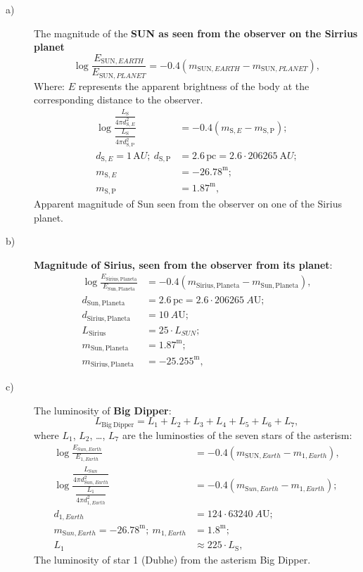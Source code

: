 \begin{description}
\item[a)] The magnitude of the \textbf{SUN as seen from the observer on the
  Sirrius planet} %
  \[ \log\frac{E_{\mathrm{SUN},EARTH}}{E_{\mathrm{SUN},PLANET}}
     = -0.4\left(m_{\mathrm{SUN},EARTH} - m_{\mathrm{SUN},PLANET}\right), \]
  Where: $E$ represents the apparent brightness of the body at the
  corresponding distance to the observer.
  \begin{align*}
  \log\frac{\dfrac{L_{\mathrm{S}}}{4\pi d_{\mathrm{S},E}^2}}
           {\dfrac{L_{\mathrm{S}}}{4\pi d_{\mathrm{S,P}}^2}}
    &= -0.4\left(m_{\mathrm{S},E} - m_{\mathrm{S,P}}\right);\\
  d_{\mathrm{S},E} = 1\,\mathrm{A}U;\
  d_{\mathrm{S,P}} &= 2.6\,\mathrm{pc}
    = 2.6\cdot206265\ \mathrm{A}U;\\
  m_{\mathrm{S},E} &= -26.78^{\mathrm{m}};\\
  m_{\mathrm{S,P}} &= 1.87^{\mathrm{m}},
  \end{align*}
  Apparent magnitude of Sun seen from the observer on one of the Sirius
  planet.
\item[b)] \textbf{Magnitude of Sirius, seen from the observer from its
  planet}:
  \begin{align*}
  \log\frac{E_{\mathrm{Sirius,Planeta}}}{E_{\mathrm{Sun,Planeta}}}
    &= -0.4\left(m_{\mathrm{Sirius,Planeta}}
       - m_{\mathrm{Sun,Planeta}}\right),\\
  d_{\mathrm{Sun,Planeta}} &= 2.6\,\mathrm{pc}
    = 2.6\cdot206265\ A\mathrm{U};\\
  d_{\mathrm{Sirius,Planeta}} &= 10\ A\mathrm{U};\\
  L_{\mathrm{Sirius}} &= 25\cdot L_{SUN};\\
  m_{\mathrm{Sun,Planeta}} &= 1.87^{\mathrm{m}};\\
  m_{\mathrm{Sirius,Planeta}} &= -25.255^{\mathrm{m}},
  \end{align*}
\item[c)] The luminosity of \textbf{Big Dipper}:
  \[ L_{\mathrm{Big\ Dipper}} = L_1 + L_2 + L_3 + L_4 + L_5 + L_6 + L_7, \]
  where $L_1$, $L_2$, \dots, $L_7$ are the luminosties %
  of the seven stars of the asterism:
  \begin{align*}
  \log\frac{E_{\mathrm{S}un,Earth}}{E_{1,Earth}}
    &= -0.4\left(m_{\mathrm{SUN},Earth} - m_{1,Earth}\right),\\
  \log\frac{\dfrac{L_{\mathrm{S}un}}{4\pi d_{\mathrm{S}un,Earth}^2}}
           {\dfrac{L_1}{4\pi d_{1,Earth}^2}}
    &= -0.4\left(m_{\mathrm{S}un,Earth} - m_{1,Earth}\right);\\
  d_{1,Earth} &= 124\cdot63240\ A\mathrm{U};\\
  m_{\mathrm{S}un,Earth} = -26.78^{\mathrm{m}};\
  m_{1,Earth} &= 1.8^{\mathrm{m}};\\
  L_1 &\approx 225\cdot L_{\mathrm{S}},
  \end{align*}
  The luminosity of star 1 (Dubhe) from the asterism Big Dipper.


\end{description}
